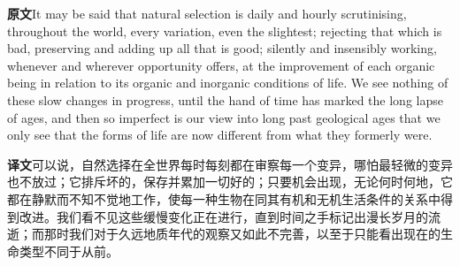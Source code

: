 \documentclass[UTF8,zihao=-4]{ctexart}
\newcommand{\BodyFont}{\fontsize{10.5pt}{15.5pt}\selectfont}
\newcommand{\origlabel}{\textbf{原文}\quad}
\newcommand{\translabel}{\textbf{译文}\quad}
\newenvironment{enblock}{\par\noindent\begingroup\BodyFont\origlabel}{\par\endgroup}
\newenvironment{zhblock}{\par\noindent\begingroup\BodyFont\translabel}{\par\endgroup\vspace{0.35em}}
\newcommand{\pair}[2]{\begin{enblock}#1\end{enblock}\begin{zhblock}#2\end{zhblock}}
\begin{document}
\pair{It may be said that natural selection is daily and hourly scrutinising, throughout the world, every variation, even the slightest; rejecting that which is bad, preserving and adding up all that is good; silently and insensibly working, whenever and wherever opportunity offers, at the improvement of each organic being in relation to its organic and inorganic conditions of life. We see nothing of these slow changes in progress, until the hand of time has marked the long lapse of ages, and then so imperfect is our view into long past geological ages that we only see that the forms of life are now different from what they formerly were.}{可以说，自然选择在全世界每时每刻都在审察每一个变异，哪怕最轻微的变异也不放过；它排斥坏的，保存并累加一切好的；只要机会出现，无论何时何地，它都在静默而不知不觉地工作，使每一种生物在同其有机和无机生活条件的关系中得到改进。我们看不见这些缓慢变化正在进行，直到时间之手标记出漫长岁月的流逝；而那时我们对于久远地质年代的观察又如此不完善，以至于只能看出现在的生命类型不同于从前。}
\end{document}
